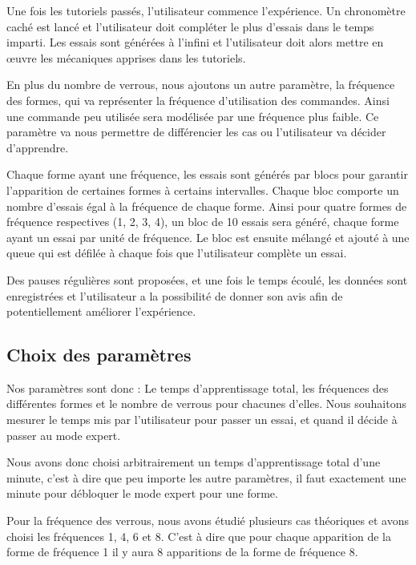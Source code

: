 \documentclass[a4paper, 12pt]{report}
\begin{document}
        Une fois les tutoriels passés, l'utilisateur commence l'expérience. Un chronomètre caché est lancé
        et l'utilisateur doit compléter le plus d'essais dans le temps imparti. Les essais
        sont générées à l'infini et l'utilisateur doit alors mettre en œuvre les mécaniques
        apprises dans les tutoriels. 
        
        En plus du nombre de verrous, nous ajoutons un autre paramètre, la fréquence des formes, qui va 
        représenter la fréquence d'utilisation des commandes. Ainsi une commande peu utilisée sera modélisée 
        par une fréquence plus faible. Ce paramètre va nous permettre de différencier les cas ou l'utilisateur va 
        décider d'apprendre.
        
        Chaque forme ayant une fréquence, les essais sont générés par blocs pour garantir l'apparition de certaines 
        formes à certains intervalles. 
        Chaque bloc comporte un nombre d'essais égal à la fréquence de chaque forme. Ainsi pour 
        quatre formes de fréquence respectives (1, 2, 3, 4), un bloc de 10 essais sera généré,
        chaque forme ayant un essai par unité de fréquence. Le bloc est ensuite mélangé et ajouté
        à une queue qui est défilée à chaque fois que l'utilisateur complète un essai.
        
        Des pauses régulières sont proposées, et une fois le temps écoulé, les 
        données sont enregistrées et l'utilisateur a la possibilité de donner son avis afin de 
        potentiellement améliorer l'expérience.
        
        \subsection{Choix des paramètres}

        Nos paramètres sont donc : Le temps d'apprentissage total, les fréquences des différentes formes et le nombre de verrous pour chacunes d'elles. 
        Nous souhaitons mesurer le temps mis par l'utilisateur pour passer un essai, et quand il décide à passer au mode expert.
        
        Nous avons donc choisi arbitrairement un temps d'apprentissage total d'une minute, c'est à dire 
        que peu importe les autre paramètres, il faut exactement une minute pour débloquer le mode expert 
        pour une forme.
        
        Pour la fréquence des verrous, nous avons étudié plusieurs cas théoriques et avons choisi les 
        fréquences 1, 4, 6 et 8.
        C'est à dire que pour chaque apparition de la forme de fréquence 1 il y aura 8 apparitions de la forme de fréquence 8.
        
\end{document}
